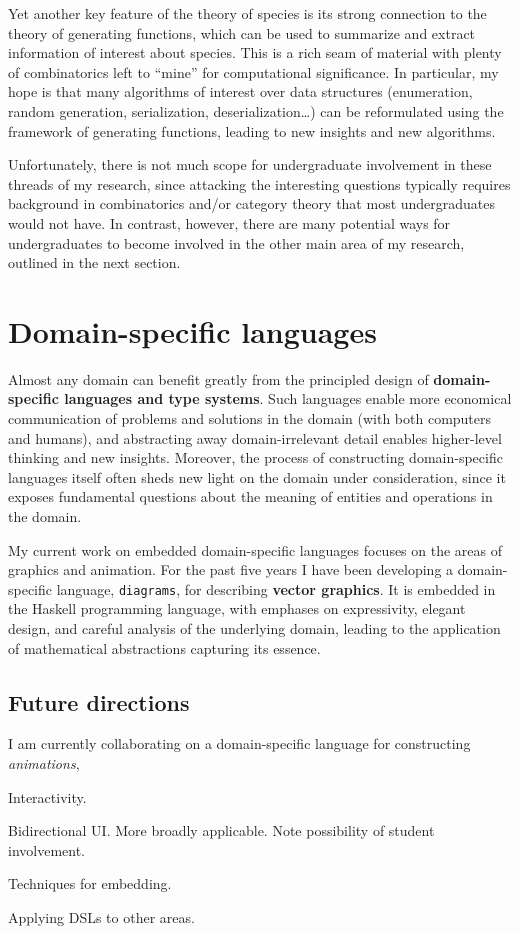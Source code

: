 \documentclass[12pt]{article}
\begin{document}
Yet another key feature of the theory of species is its strong
connection to the theory of generating functions, which can be used to
summarize and extract information of interest about species.  This is
a rich seam of material with plenty of combinatorics left to ``mine''
for computational significance.  In particular, my hope is that many
algorithms of interest over data structures (enumeration, random
generation, serialization, deserialization\dots) can be reformulated
using the framework of generating functions, leading to new insights
and new algorithms.

Unfortunately, there is not much scope for undergraduate involvement
in these threads of my research, since attacking the interesting
questions typically requires background in combinatorics and/or
category theory that most undergraduates would not have.  In contrast,
however, there are many potential ways for undergraduates to become
involved in the other main area of my research, outlined in the next
section.

\section*{Domain-specific languages}
\label{sec:edsls}

Almost any domain can benefit greatly from the principled design of
\textbf{domain-specific languages and type systems}.  Such languages
enable more economical communication of problems and solutions in the
domain (with both computers and humans), and abstracting away
domain-irrelevant detail enables higher-level thinking and new
insights.  Moreover, the process of constructing domain-specific
languages itself often sheds new light on the domain under
consideration, since it exposes fundamental questions about the
meaning of entities and operations in the domain.

My current work on embedded domain-specific languages focuses on the
areas of graphics and animation.  For the past five years I have been
developing a domain-specific language, \texttt{diagrams}, for
describing \textbf{vector graphics}.  It is embedded in the Haskell
programming language, with emphases on expressivity, elegant design,
and careful analysis of the underlying domain, leading to the
application of mathematical abstractions capturing its essence.

\subsection*{Future directions}

I am currently collaborating on a domain-specific language for
constructing \emph{animations}, 

Interactivity.

Bidirectional UI.  More broadly applicable.  Note possibility of
student involvement.

Techniques for embedding.

Applying DSLs to other areas.
\end{document}

